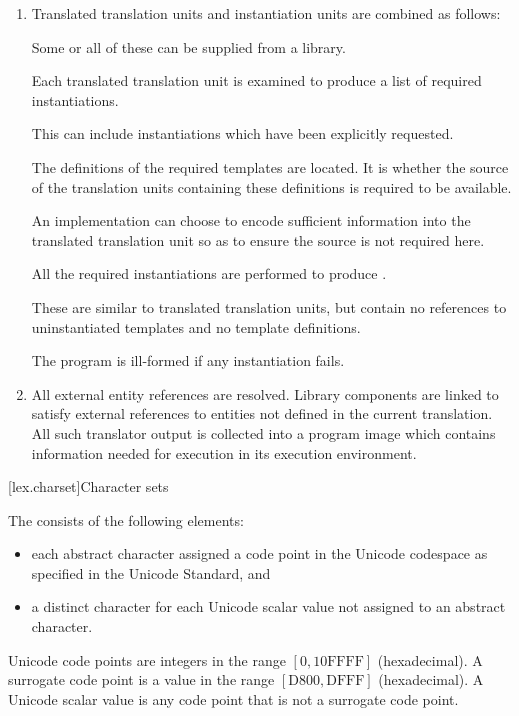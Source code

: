 \begin{enumerate}
\item Translated translation units and instantiation units are combined
as follows:
\begin{note}
Some or all of these can be supplied from a
library.
\end{note}
Each translated translation unit is examined to
produce a list of required instantiations.
\begin{note}
This can include
instantiations which have been explicitly
requested.
\end{note}
The definitions of the
required templates are located. It is  whether the
source of the translation units containing these definitions is required
to be available.
\begin{note}
An implementation can choose to encode sufficient
information into the translated translation unit so as to ensure the
source is not required here.
\end{note}
All the required instantiations
are performed to produce
.
\begin{note}
These are similar
to translated translation units, but contain no references to
uninstantiated templates and no template definitions.
\end{note}
The
program is ill-formed if any instantiation fails.

\item All external entity references are resolved. Library
components are linked to satisfy external references to
entities not defined in the current translation. All such translator
output is collected into a program image which contains information
needed for execution in its execution environment.%
\end{enumerate}

[lex.charset]{Character sets}

\pnum
{}%
The  consists of the following elements:
\begin{itemize}
\item
each abstract character assigned a code point in the Unicode codespace
as specified in the Unicode Standard, and
\item
a distinct character for each Unicode scalar value
not assigned to an abstract character.
\end{itemize}
\begin{note}
Unicode code points are integers
in the range $[0, \mathrm{10FFFF}]$ (hexadecimal).
A surrogate code point is a value
in the range $[\mathrm{D800}, \mathrm{DFFF}]$ (hexadecimal).
A Unicode scalar value is any code point that is not a surrogate code point.
\end{note}

